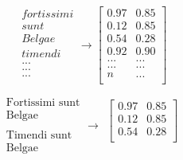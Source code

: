 \begin{figure}
    \centering
    \noindent\begin{minipage}{.32\linewidth}
        \begin{equation*}
            \begin{matrix}
            fortissimi \\ 
            sunt \\ 
            Belgae \\ 
            timendi \\ 
            ... \\ 
            ... \\ 
            ... \\ 
            \end{matrix}
            \rightarrow 
            \begin{bmatrix}
            0.97 & 0.85 \\ 
            0.12 & 0.85 \\ 
            0.54 & 0.28 \\ 
            0.92 & 0.90 \\ 
            ... & ... \\ 
            ... & ... \\ 
            n & ... \\ 
            \end{bmatrix}
        \end{equation*}
    \end{minipage}%
    \begin{minipage}{.32\linewidth}
        \begin{equation*}
            \begin{matrix}
                \textrm{Fortissimi sunt} \\ 
                \textrm{Belgae} \\ \\
                \textrm{Timendi sunt} \\
                \textrm{Belgae}
            \end{matrix}
            \rightarrow
            \begin{matrix}
            
            \begin{bmatrix}
            0.97 & 0.85 \\ 
            0.12 & 0.85 \\ 
            0.54 & 0.28 \\ 
            \end{bmatrix} \\ \\
            

\end{matrix}
\end{equation*}
\end{minipage}
\end{figure}

